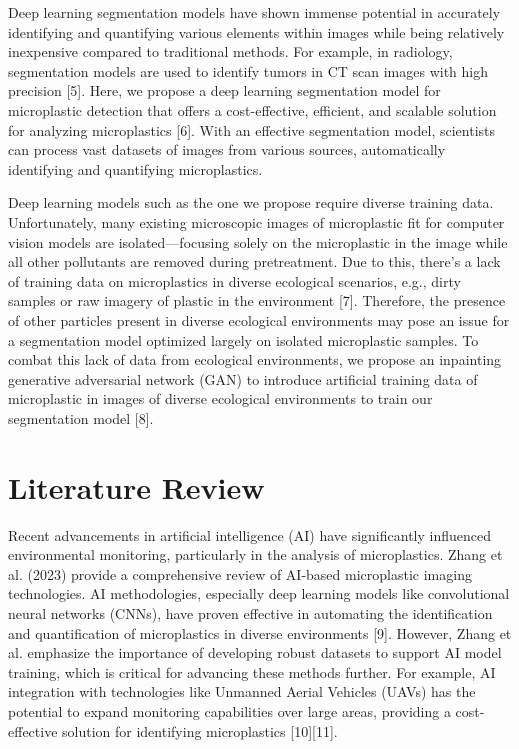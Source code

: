 \documentclass{article}
\begin{document}
Deep learning segmentation models have shown immense potential in accurately identifying and quantifying various elements within images while being relatively inexpensive compared to traditional methods. For example, in radiology, segmentation models are used to identify tumors in CT scan images with high precision [5]. Here, we propose a deep learning segmentation model for microplastic detection that offers a cost-effective, efficient, and scalable solution for analyzing microplastics [6]. With an effective segmentation model, scientists can process vast datasets of images from various sources, automatically identifying and quantifying microplastics.

Deep learning models such as the one we propose require diverse training data. Unfortunately, many existing microscopic images of microplastic fit for computer vision models are isolated---focusing solely on the microplastic in the image while all other pollutants are removed during pretreatment. Due to this, there's a lack of training data on microplastics in diverse ecological scenarios, e.g., dirty samples or raw imagery of plastic in the environment [7]. Therefore, the presence of other particles present in diverse ecological environments may pose an issue for a segmentation model optimized largely on isolated microplastic samples. To combat this lack of data from ecological environments, we propose an inpainting generative adversarial network (GAN) to introduce artificial training data of microplastic in images of diverse ecological environments to train our segmentation model [8].

\section{Literature Review}

Recent advancements in artificial intelligence (AI) have significantly influenced environmental monitoring, particularly in the analysis of microplastics. Zhang et al. (2023) provide a comprehensive review of AI-based microplastic imaging technologies. AI methodologies, especially deep learning models like convolutional neural networks (CNNs), have proven effective in automating the identification and quantification of microplastics in diverse environments [9]. However, Zhang et al. emphasize the importance of developing robust datasets to support AI model training, which is critical for advancing these methods further. For example, AI integration with technologies like Unmanned Aerial Vehicles (UAVs) has the potential to expand monitoring capabilities over large areas, providing a cost-effective solution for identifying microplastics [10][11].
\end{document}
